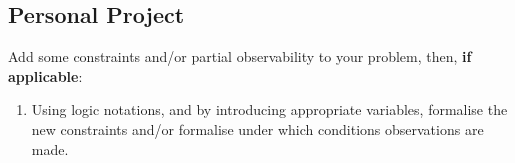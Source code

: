 \documentclass[11pt]{article}
\numberwithin{equation}{section}
\begin{document}
\subsection{Personal Project}

Add some constraints and/or partial observability to your problem, then, \textbf{if applicable}:
\begin{enumerate}
\item Using logic notations, and by introducing appropriate variables, formalise the new constraints and/or formalise under which conditions observations are made. 
\end{enumerate}
\end{document}
